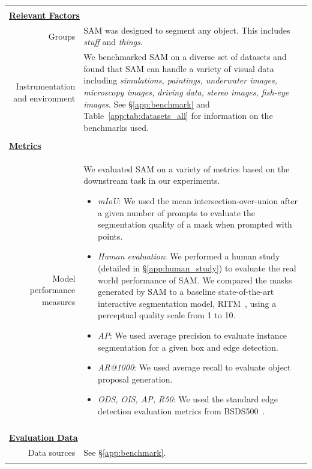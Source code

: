 \documentclass[10pt,twocolumn,letterpaper]{article}
\newcommand{\sam}{SAM\xspace}
\begin{document}
\begin{table}
\begin{tabular*}{\linewidth}{r|p{12cm}}
\multicolumn{2}{c}{} \\
\multicolumn{2}{l}{\bf\underline{Relevant Factors}} \\
Groups & \sam was designed to segment any object. This includes \textit{stuff} and \textit{things}.\\
Instrumentation and environment & We benchmarked \sam on a diverse set of datasets and found that \sam can handle a variety of visual data including \textit{simulations, paintings, underwater images, microscopy images, driving data, stereo images, fish-eye images}. See \S\ref{app:benchmark} and Table~\ref{app:tab:datasets_all} for information on the benchmarks used. \\
\multicolumn{2}{c}{} \\
\multicolumn{2}{l}{\bf\underline{Metrics}} \\
Model performance measures & We evaluated \sam on a variety of metrics based on the downstream task in our experiments.
\begin{itemize}
\itemsep-0.2em
\item{\textit{mIoU}: We used the mean intersection-over-union after a given number of prompts to evaluate the segmentation quality of a mask when prompted with points.}
\item{\textit{Human evaluation}: We performed a human study (detailed in \S\ref{app:human_study}) to evaluate the real world performance of \sam. We compared the masks generated by \sam to a baseline state-of-the-art interactive segmentation model, RITM~\cite{sofiiuk2022reviving}, using a perceptual quality scale from 1 to 10.}
\item{\textit{AP}: We used average precision to evaluate instance segmentation for a given box and edge detection.}
\item{\textit{AR@1000}: We used average recall to evaluate object proposal generation.}
\item{\textit{ODS, OIS, AP, R50}: We used the standard edge detection evaluation metrics from BSDS500~\cite{martin2001database,arbelaez2010contour}.}\vspace{-1.2em}%
\end{itemize}\\
\multicolumn{2}{c}{} \\
\multicolumn{2}{l}{\bf\underline{Evaluation Data}} \\
Data sources & See \S\ref{app:benchmark}. \\
\multicolumn{2}{c}{} \\

\end{tabular*}
\end{table}
\end{document}
